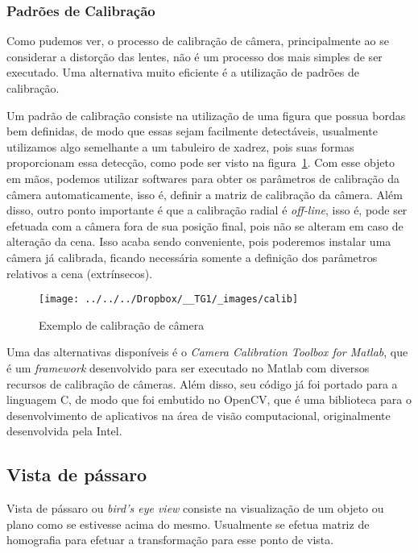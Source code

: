 \documentclass[ecp,tc]{iiufrgs}
\begin{document}
\subsubsection{Padrões de Calibração}

Como pudemos ver, o processo de calibração de câmera, principalmente ao se considerar a distorção das lentes, não é um processo dos mais simples de ser executado. Uma alternativa muito eficiente é a utilização de padrões de calibração.

Um padrão de calibração consiste na utilização de uma figura que possua bordas bem definidas, de modo que essas sejam facilmente detectáveis, usualmente utilizamos algo semelhante a um tabuleiro de xadrez, pois suas formas proporcionam essa detecção, como pode ser visto na figura~\ref{fig:calib}. Com esse objeto em mãos, podemos utilizar softwares para obter os parâmetros de calibração da câmera automaticamente, isso é, definir a matriz de calibração da câmera. Além disso, outro ponto importante é que a calibração radial é \textit{off-line}, isso é, pode ser efetuada com a câmera fora de sua posição final, pois não se alteram em caso de alteração da cena. Isso acaba sendo conveniente, pois poderemos instalar uma câmera já calibrada, ficando necessária somente a definição dos parâmetros relativos a cena (extrínsecos).

\begin{figure}
	\centering
	\caption{Exemplo de calibração de câmera}
	\texttt{[image: ../../../Dropbox/\_\_TG1/\_images/calib]}
	\label{fig:calib}
\end{figure}

Uma das alternativas disponíveis é o \textit{Camera Calibration Toolbox for Matlab}, que é um \textit{framework} desenvolvido para ser executado no Matlab com diversos recursos de calibração de câmeras. Além disso, seu código já foi portado para a linguagem C, de modo que foi embutido no OpenCV, que é uma biblioteca para o desenvolvimento de aplicativos na área de visão computacional, originalmente desenvolvida pela Intel.

\subsection{Vista de pássaro}

Vista de pássaro ou \textit{bird's eye view} consiste na visualização de um objeto ou plano como se estivesse acima do mesmo. Usualmente se efetua matriz de homografia para efetuar a transformação para esse ponto de vista.
\end{document}
